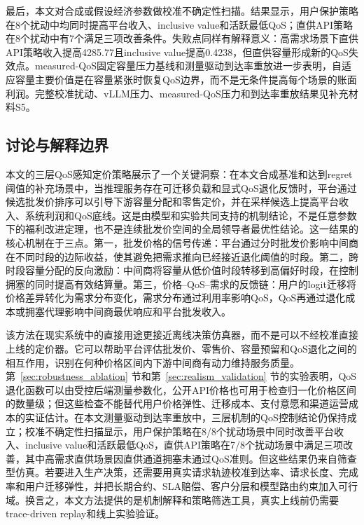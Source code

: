 \documentclass[UTF8,11pt]{ctexart}
\begin{document}
最后，本文对合成或假设经济参数做校准不确定性扫描。结果显示，用户保护策略在8个扰动中均同时提高平台收入、inclusive value和活跃最低QoS；直供API策略在8个扰动中有7个满足三项改善条件。失败点同样有解释意义：高需求场景下直供API策略收入提高4285.77且inclusive value提高0.4238，但直供容量形成新的QoS失效点。measured-QoS固定容量压力基线和测量驱动到达率重放进一步表明，自适应容量主要价值是在容量紧张时恢复QoS边界，而不是无条件提高每个场景的账面利润。完整校准扰动、vLLM压力、measured-QoS压力和到达率重放结果见补充材料S5。

\subsection{讨论与解释边界}
\label{sec:discussion}

本文的三层QoS感知定价策略展示了一个关键洞察：在本文合成基准和达到regret阈值的补充场景中，当推理服务存在可迁移负载和显式QoS退化反馈时，平台通过候选批发价排序可以引导下游容量分配和零售定价，并在采样候选上提高平台收入、系统利润和QoS底线。这是由模型和实验共同支持的机制结论，不是任意参数下的福利改进定理，也不是连续批发价空间的全局领导者最优性结论。这一结果的核心机制在于三点。第一，批发价格的信号传递：平台通过分时批发价影响中间商在不同时段的边际收益，使其避免把需求推向已经接近退化阈值的时段。第二，跨时段容量分配的反向激励：中间商将容量从低价值时段转移到高偏好时段，在控制拥塞的同时提高有效结算量。第三，价格--QoS--需求的反馈链：用户的logit迁移将价格差异转化为需求分布变化，需求分布通过利用率影响QoS，QoS再通过退化成本或拥塞代理影响中间商最优响应和平台批发收入。

该方法在现实系统中的直接用途更接近离线决策仿真器，而不是可以不经校准直接上线的定价器。它可以帮助平台评估批发价、零售价、容量预留和QoS退化之间的相互作用，识别在何种价格区间内下游中间商有动力维持服务质量。第~\ref{sec:robustness_ablation} 节和第~\ref{sec:realism_validation} 节的实验表明，QoS退化函数可以由受控后端测量参数化，公开API价格也可用于检查归一化价格区间的数量级；但这些检查不能替代用户价格弹性、迁移成本、支付意愿和渠道运营成本的实证估计。在本文测量驱动到达率重放中，三层机制的QoS控制结论仍保持成立；校准不确定性扫描显示，用户保护策略在8/8个扰动场景中同时改善平台收入、inclusive value和活跃最低QoS，直供API策略在7/8个扰动场景中满足三项改善，其中高需求直供场景因直供通道拥塞未通过QoS准则。但这些结果仍来自筛查型仿真。若要进入生产决策，还需要用真实请求轨迹校准到达率、请求长度、完成率和用户迁移弹性，并把长期合约、SLA赔偿、客户分层和模型路由约束加入可行域。换言之，本文方法提供的是机制解释和策略筛选工具，真实上线前仍需要trace-driven replay和线上实验验证。
\end{document}
